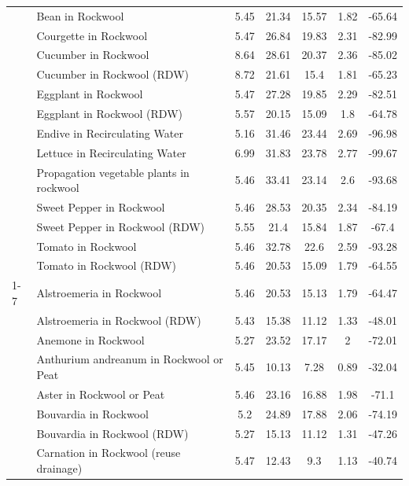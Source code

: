 \documentclass[
  letterpaper,
  DIV=11,
  numbers=noendperiod]{scrreprt}
\begin{document}
\begin{longtable}[t]{llccccc}
\endfoot
\bottomrule
\endlastfoot
 & Bean in Rockwool & 5.45 & 21.34 & 15.57 & 1.82 & -65.64\\
\nopagebreak
 & Courgette in Rockwool & 5.47 & 26.84 & 19.83 & 2.31 & -82.99\\
\nopagebreak
 & Cucumber in Rockwool & 8.64 & 28.61 & 20.37 & 2.36 & -85.02\\
\nopagebreak
 & Cucumber in Rockwool (RDW) & 8.72 & 21.61 & 15.4 & 1.81 & -65.23\\
\nopagebreak
 & Eggplant in Rockwool & 5.47 & 27.28 & 19.85 & 2.29 & -82.51\\
\nopagebreak
 & Eggplant in Rockwool (RDW) & 5.57 & 20.15 & 15.09 & 1.8 & -64.78\\
\nopagebreak
 & Endive in Recirculating Water & 5.16 & 31.46 & 23.44 & 2.69 & -96.98\\
\nopagebreak
 & Lettuce in Recirculating Water & 6.99 & 31.83 & 23.78 & 2.77 & -99.67\\
\nopagebreak
 & Propagation vegetable plants in rockwool & 5.46 & 33.41 & 23.14 & 2.6 & -93.68\\
\nopagebreak
 & Sweet Pepper in Rockwool & 5.46 & 28.53 & 20.35 & 2.34 & -84.19\\
\nopagebreak
 & Sweet Pepper in Rockwool (RDW) & 5.55 & 21.4 & 15.84 & 1.87 & -67.4\\
\nopagebreak
 & Tomato in Rockwool & 5.46 & 32.78 & 22.6 & 2.59 & -93.28\\
\nopagebreak
\multirow[t]{-13}{*}{\raggedright\arraybackslash Olericulture} & Tomato in Rockwool (RDW) & 5.46 & 20.53 & 15.09 & 1.79 & -64.55\\
\cmidrule{1-7}\pagebreak[0]
 & Alstroemeria in Rockwool & 5.46 & 20.53 & 15.13 & 1.79 & -64.47\\
\nopagebreak
 & Alstroemeria in Rockwool (RDW) & 5.43 & 15.38 & 11.12 & 1.33 & -48.01\\
\nopagebreak
 & Anemone in Rockwool & 5.27 & 23.52 & 17.17 & 2 & -72.01\\
\nopagebreak
 & Anthurium andreanum in Rockwool or Peat & 5.45 & 10.13 & 7.28 & 0.89 & -32.04\\
\nopagebreak
 & Aster in Rockwool or Peat & 5.46 & 23.16 & 16.88 & 1.98 & -71.1\\
\nopagebreak
 & Bouvardia in Rockwool & 5.2 & 24.89 & 17.88 & 2.06 & -74.19\\
\nopagebreak
 & Bouvardia in Rockwool (RDW) & 5.27 & 15.13 & 11.12 & 1.31 & -47.26\\
\nopagebreak
 & Carnation in Rockwool (reuse drainage) & 5.47 & 12.43 & 9.3 & 1.13 & -40.74\\

\end{longtable}
\end{document}
